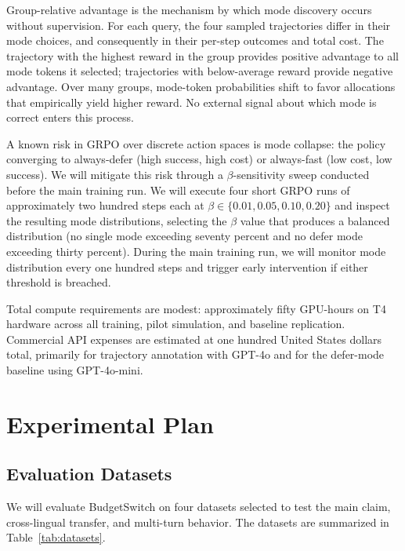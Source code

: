 \documentclass[11pt,a4paper]{article}
\begin{document}
Group-relative advantage is the mechanism by which mode discovery occurs without supervision. For each query, the four sampled trajectories differ in their mode choices, and consequently in their per-step outcomes and total cost. The trajectory with the highest reward in the group provides positive advantage to all mode tokens it selected; trajectories with below-average reward provide negative advantage. Over many groups, mode-token probabilities shift to favor allocations that empirically yield higher reward. No external signal about which mode is correct enters this process.

A known risk in GRPO over discrete action spaces is mode collapse: the policy converging to always-defer (high success, high cost) or always-fast (low cost, low success). We will mitigate this risk through a $\beta$-sensitivity sweep conducted before the main training run. We will execute four short GRPO runs of approximately two hundred steps each at $\beta \in \{0.01, 0.05, 0.10, 0.20\}$ and inspect the resulting mode distributions, selecting the $\beta$ value that produces a balanced distribution (no single mode exceeding seventy percent and no defer mode exceeding thirty percent). During the main training run, we will monitor mode distribution every one hundred steps and trigger early intervention if either threshold is breached.

Total compute requirements are modest: approximately fifty GPU-hours on T4 hardware across all training, pilot simulation, and baseline replication. Commercial API expenses are estimated at one hundred United States dollars total, primarily for trajectory annotation with GPT-4o and for the defer-mode baseline using GPT-4o-mini.

\section{Experimental Plan}

\subsection{Evaluation Datasets}

We will evaluate BudgetSwitch on four datasets selected to test the main claim, cross-lingual transfer, and multi-turn behavior. The datasets are summarized in Table~\ref{tab:datasets}.
\end{document}
